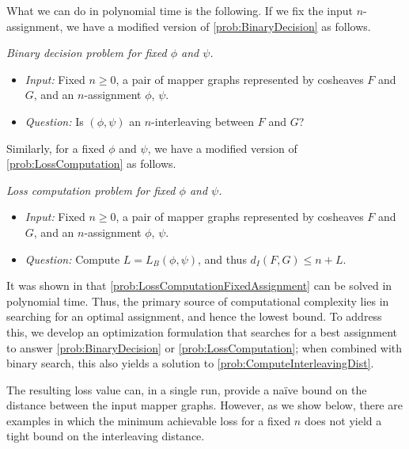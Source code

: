 What we can do in polynomial time is the following. 
If we fix the input $n$-assignment, we have a modified version of \cref{prob:BinaryDecision} as follows.

\begin{problem} 
\label{prob:BinaryDecisionFixedAssignment} 
\emph{Binary decision problem for fixed $\phi$ and $\psi$.}
\begin{itemize}
    \item \emph{Input:} Fixed $n\geq 0$, a pair of mapper graphs represented by cosheaves  $F$ and $G$, and an $n$-assignment $\phi$, $\psi$. 
    \item \emph{Question:} Is $(\phi,\psi)$ an $n$-interleaving between $F$ and $G$? 
\end{itemize}
\end{problem}

Similarly, for a fixed $\phi$ and $\psi$, we have a modified version of \cref{prob:LossComputation} as follows. 

\begin{problem} 
\label{prob:LossComputationFixedAssignment} 
\emph{Loss computation problem for fixed $\phi$ and $\psi$.}
\begin{itemize}
    \item \emph{Input:} Fixed $n\geq 0$, a pair of mapper graphs represented by cosheaves  $F$ and $G$, and an $n$-assignment $\phi$, $\psi$. 
    \item \emph{Question:} Compute $L = L_B(\phi,\psi)$, and thus $d_I(F,G) \leq n+L$.  
\end{itemize}
\end{problem}

It was shown in \cite{chambers2023bounding} that \cref{prob:LossComputationFixedAssignment} can be solved in polynomial time. Thus, the primary source of computational complexity lies in searching for an optimal assignment, and hence the lowest bound. To address this, we develop an optimization formulation that searches for a best assignment to answer \cref{prob:BinaryDecision} or \cref{prob:LossComputation}; when combined with binary search, this also yields a solution to \cref{prob:ComputeInterleavingDist}.

The resulting loss value can, in a single run, provide a na\"ive bound on the distance between the input mapper graphs. However, as we show below, there are examples in which the minimum achievable loss for a fixed $n$ does not yield a tight bound on the interleaving distance.
 

